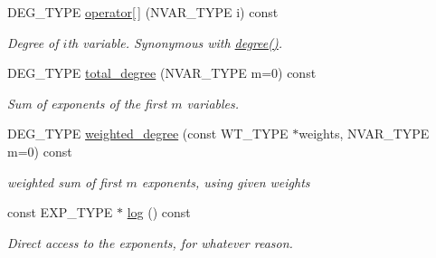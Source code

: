 \begin{Indent}
\begin{DoxyCompactItemize}
D\+E\+G\+\_\+\+T\+Y\+PE \hyperlink{class_monomial_ab3c18ba0fe7442e07d630bddea3469b5}{operator\mbox{[}$\,$\mbox{]}} (N\+V\+A\+R\+\_\+\+T\+Y\+PE i) const
\begin{DoxyCompactList}\small\item\em Degree of $i$th variable. Synonymous with \hyperlink{class_monomial_a817508c95fe721c56c78d91975b8416b}{degree()}. \end{DoxyCompactList}\item 
D\+E\+G\+\_\+\+T\+Y\+PE \hyperlink{class_monomial_afe6df62857d9f58634d5f6c668f12d35}{total\+\_\+degree} (N\+V\+A\+R\+\_\+\+T\+Y\+PE m=0) const
\begin{DoxyCompactList}\small\item\em Sum of exponents of the first $m$ variables. \end{DoxyCompactList}\item 
D\+E\+G\+\_\+\+T\+Y\+PE \hyperlink{class_monomial_a5b19863967dc9801997d2d1058f312a3}{weighted\+\_\+degree} (const W\+T\+\_\+\+T\+Y\+PE $\ast$weights, N\+V\+A\+R\+\_\+\+T\+Y\+PE m=0) const
\begin{DoxyCompactList}\small\item\em weighted sum of first $m$ exponents, using given weights \end{DoxyCompactList}\item 
\mbox{\label{class_monomial_a6b5a0acb65334373ed437045f9835a61}} 
const E\+X\+P\+\_\+\+T\+Y\+PE $\ast$ \hyperlink{class_monomial_a6b5a0acb65334373ed437045f9835a61}{log} () const
\begin{DoxyCompactList}\small\item\em Direct access to the exponents, for whatever reason. \end{DoxyCompactList}\end{DoxyCompactItemize}
\end{Indent}
